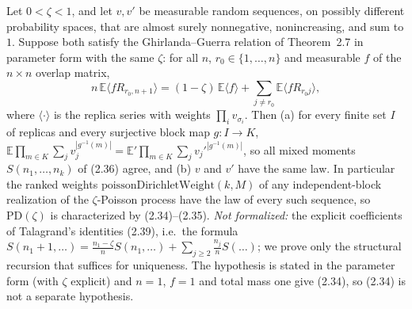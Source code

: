 \begin{theorem}\label{thm:sg:pd-uniqueness}
  \leanok
Let $0<\zeta<1$, and let $v,v'$ be measurable random sequences, on possibly different probability spaces, that are almost surely nonnegative, nonincreasing, and sum to $1$. Suppose both satisfy the Ghirlanda--Guerra relation of Theorem~2.7 in parameter form with the same $\zeta$: for all $n$, $r_0\in\{1,\dots,n\}$ and measurable $f$ of the $n\times n$ overlap matrix,
\[
n\,\mathbb E\langle fR_{r_0,n+1}\rangle=(1-\zeta)\,\mathbb E\langle f\rangle+\sum_{j\ne r_0}\mathbb E\langle fR_{r_0j}\rangle,
\]
where $\langle\cdot\rangle$ is the replica series with weights $\prod_iv_{\sigma_i}$. Then (a) for every finite set $I$ of replicas and every surjective block map $g:I\to K$, $\mathbb E\prod_{m\in K}\sum_jv_j^{|g^{-1}(m)|}=\mathbb E'\prod_{m\in K}\sum_jv_j'^{|g^{-1}(m)|}$, so all mixed moments $S(n_1,\dots,n_k)$ of (2.36) agree, and (b) $v$ and $v'$ have the same law. In particular the ranked weights $\mathrm{poissonDirichletWeight}(k,M)$ of any independent-block realization of the $\zeta$-Poisson process have the law of every such sequence, so $\mathrm{PD}(\zeta)$ is characterized by (2.34)--(2.35). \emph{Not formalized:} the explicit coefficients of Talagrand's identities (2.39), i.e.\ the formula $S(n_1+1,\dots)=\frac{n_1-\zeta}{n}S(n_1,\dots)+\sum_{j\ge2}\frac{n_j}n S(\dots)$; we prove only the structural recursion that suffices for uniqueness. The hypothesis is stated in the parameter form (with $\zeta$ explicit) and $n=1$, $f=1$ and total mass one give (2.34), so (2.34) is not a separate hypothesis.
\end{theorem}
